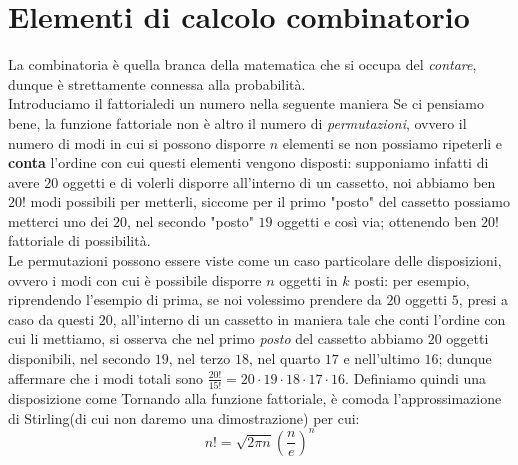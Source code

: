 \documentclass{report}
\begin{document}
	\section{Elementi di calcolo combinatorio}
	La combinatoria è quella branca della matematica che si occupa del \emph{contare}, dunque è strettamente connessa alla probabilità. \\
	Introduciamo il fattoriale\ignorespaces di un numero nella seguente maniera
\noindent Se ci pensiamo bene, la funzione fattoriale non è altro il numero di \emph{permutazioni}, ovvero il numero di modi in cui si possono disporre $n$ elementi se non possiamo ripeterli e \textbf{conta} l'ordine con cui questi elementi vengono disposti: supponiamo infatti di avere $20$ oggetti e di volerli disporre all'interno di un cassetto, noi abbiamo ben $20!$ modi possibili per metterli, siccome per il primo "posto" del cassetto possiamo metterci uno dei $20$, nel secondo "posto" $19$ oggetti e così via; ottenendo ben $20!$ fattoriale di possibilità. \\
	Le permutazioni possono essere viste come un caso particolare delle disposizioni, ovvero i modi con cui è possibile disporre $n$ oggetti in $k$ posti: per esempio, riprendendo l'esempio di prima, se noi volessimo prendere da $20$ oggetti $5$, presi a caso da questi $20$, all'interno di un cassetto in maniera tale che conti l'ordine con cui li mettiamo, si osserva che nel primo \emph{posto} del cassetto abbiamo $20$ oggetti disponibili, nel secondo $19$, nel terzo $18$, nel quarto $17$ e nell'ultimo $16$; dunque affermare che i modi totali sono $\frac{20!}{15!} = 20 \cdot 19 \cdot 18 \cdot 17 \cdot 16$. Definiamo quindi una disposizione come
\noindent Tornando alla funzione fattoriale, è comoda l'approssimazione di Stirling\ignorespaces (di cui non daremo una dimostrazione) per cui:
\begin{equation}
	n! = \sqrt{2\pi n} \left( \frac{n}{e} \right)^n
\end{equation}
\end{document}
